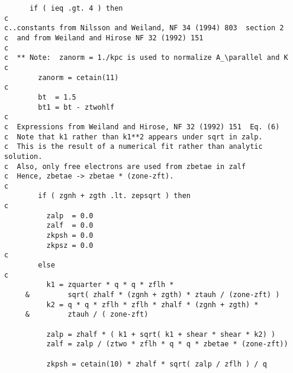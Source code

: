 \begin{verbatim}
      if ( ieq .gt. 4 ) then
c
c..constants from Nilsson and Weiland, NF 34 (1994) 803  section 2
c  and from Weiland and Hirose NF 32 (1992) 151
c
c  ** Note:  zanorm = 1./kpc is used to normalize A_\parallel and K
c
        zanorm = cetain(11)
c
        bt  = 1.5
        bt1 = bt - ztwohlf
c
c  Expressions from Weiland and Hirose, NF 32 (1992) 151  Eq. (6)
c  Note that k1 rather than k1**2 appears under sqrt in zalp.
c  This is the result of a numerical fit rather than analytic solution.
c  Also, only free electrons are used from zbetae in zalf
c  Hence, zbetae -> zbetae * (zone-zft).
c
        if ( zgnh + zgth .lt. zepsqrt ) then
c
          zalp  = 0.0
          zalf  = 0.0
          zkpsh = 0.0
          zkpsz = 0.0
c
        else
c
          k1 = zquarter * q * q * zflh *
     &         sqrt( zhalf * (zgnh + zgth) * ztauh / (zone-zft) )
          k2 = q * q * zflh * zflh * zhalf * (zgnh + zgth) *
     &         ztauh / ( zone-zft)

          zalp = zhalf * ( k1 + sqrt( k1 + shear * shear * k2) )
          zalf = zalp / (ztwo * zflh * q * q * zbetae * (zone-zft))

          zkpsh = cetain(10) * zhalf * sqrt( zalp / zflh ) / q


\end{verbatim}
